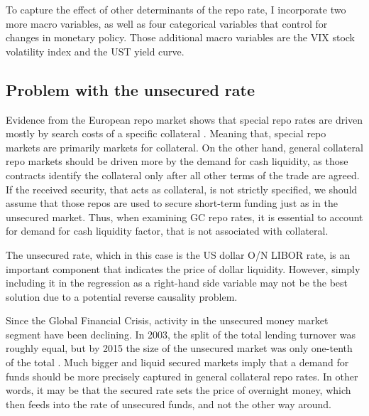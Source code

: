 \documentclass[11pt,a4paper,english,oneside]{article}
\begin{document}
To capture the effect of other determinants of the repo rate, I incorporate two more macro variables, as well as four categorical variables that control for changes in monetary policy. Those additional macro variables are the VIX stock volatility index and the UST yield curve.


\subsection{Problem with the unsecured rate} \label{sec:unsecured}

Evidence from the European repo market shows that special repo rates are driven mostly by search costs of a specific collateral \citep{schaffner2019}. Meaning that, special repo markets are primarily markets for collateral. On the other hand, general collateral repo markets should be driven more by the demand for cash liquidity, as those contracts identify the collateral only after all other terms of the trade are agreed. If the received security, that acts as collateral, is not strictly specified, we should assume that those repos are used to secure short-term funding just as in the unsecured market. Thus, when examining GC repo rates, it is essential to account for demand for cash liquidity factor, that is not associated with collateral.

The unsecured rate, which in this case is the US dollar O/N LIBOR rate, is an important component that indicates the price of dollar liquidity. However, simply including it in the regression as a right-hand side variable may not be the best solution due to a potential reverse causality problem.

Since the Global Financial Crisis, activity in the unsecured money market segment have been declining. In 2003, the split of the total lending turnover was roughly equal, but by 2015 the size of the unsecured market was only one-tenth of the total \citep{fiore2018}. Much bigger and liquid secured markets imply that a demand for funds should be more precisely captured in general collateral repo rates. In other words, it may be that the secured rate sets the price of overnight money, which then feeds into the rate of unsecured funds, and not the other way around.
\end{document}
